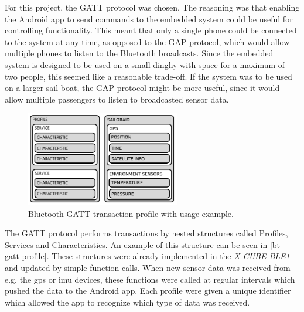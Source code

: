 For this project, the GATT protocol was chosen. The reasoning was that enabling the Android app to send commands to the embedded system could be useful for controlling functionality. This meant that only a single phone could be connected to the system at any time, as opposed to the GAP protocol, which would allow multiple phones to listen to the Bluetooth broadcasts. Since the embedded system is designed to be used on a small dinghy with space for a maximum of two people, this seemed like a reasonable trade-off. If the system was to be used on a larger sail boat, the GAP protocol might be more useful, since it would allow multiple passengers to listen to broadcasted sensor data.
\begin{figure}[H]
\centering
\includegraphics[width=0.6\textwidth]{Figures/bt_gatt_profile.png}
\caption{Bluetooth GATT transaction profile with usage example.}
\label{bt-gatt-profile}
\end{figure}

The GATT protocol performs transactions by nested structures called Profiles, Services and Characteristics. An example of this structure can be seen in \autoref{bt-gatt-profile}. These structures were already implemented in the \emph{X-CUBE-BLE1} and updated by simple function calls. When new sensor data was received from e.g. the \gls{gps} or \gls{imu} devices, these functions were called at regular intervals which pushed the data to the Android app. Each profile were given a unique identifier which allowed the app to recognize which type of data was received.

